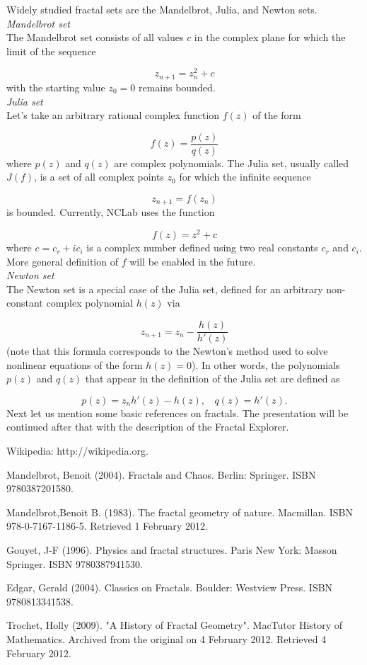 \documentclass[article,A4,12pt]{llncs}
\begin{document}
Widely studied fractal sets are the Mandelbrot, Julia, and Newton sets. \\

\noindent
{\em Mandelbrot set}\\
The Mandelbrot set consists of all values 
$c$ in the complex plane for which the limit of the sequence 

$$
z_{n+1} = z_n^2 + c
$$
with the starting value $z_0 = 0$ remains bounded.\\

\noindent
{\em Julia set}\\
Let's take an arbitrary rational complex function $f(z)$ of the form  

$$
f(z) = \frac{p(z)}{q(z)}
$$
where $p(z)$ and $q(z)$ are complex polynomials.
The Julia set, usually called $J(f)$, is a set of all complex points $z_0$ 
for which the infinite sequence 

$$
z_{n+1} = f(z_n)
$$
is bounded. Currently, NCLab uses the function 

$$
f(z) = z^2 + c
$$
where $c = c_r + i c_i$ is a complex number defined using two real constants 
$c_r$ and $c_i$. More general definition of $f$ will be enabled in the future.\\

\noindent
{\em Newton set}\\
The Newton set is a special case of the Julia set, defined for an 
arbitrary non-constant complex polynomial $h(z)$ via

$$
z_{n+1} = z_n - \frac{h(z)}{h'(z)}
$$
(note that this formula corresponds to the Newton's method used
to solve nonlinear equations of the form $h(z) = 0$). In other words, the 
polynomials $p(z)$ and $q(z)$ that appear in the definition of the Julia
set are defined as

$$
p(z) = z_n h'(z) - h(z), \ \ \ \ q(z) = h'(z). 
$$
Next let us mention some basic references on fractals. The 
presentation will be continued after that with the description 
of the Fractal Explorer.



\begin{thebibliography}{00}

Wikipedia: http://wikipedia.org.

Mandelbrot, Benoit (2004). Fractals and Chaos. Berlin: Springer. ISBN 9780387201580. 

Mandelbrot,Benoit B. (1983). The fractal geometry of nature. Macmillan. ISBN 978-0-7167-1186-5. Retrieved 1 February 2012.

Gouyet, J-F (1996). Physics and fractal structures. Paris New York: Masson Springer. ISBN 9780387941530.

Edgar, Gerald (2004). Classics on Fractals. Boulder: Westview Press. ISBN 9780813341538.

Trochet, Holly (2009). "A History of Fractal Geometry". MacTutor History of Mathematics. Archived from the original on 4 February 2012. Retrieved 4 February 2012.

 \end{thebibliography}
\end{document}
